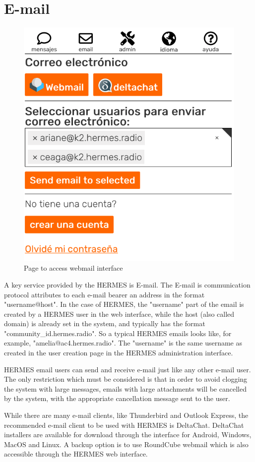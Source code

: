\documentclass[11pt,a4paper]{article}
\begin{document}
\section{E-mail}
\label{email}

\begin{figure}[H]
    \centering
    \includegraphics[width=0.5\columnwidth]{screenshots/frontend/es/email.png}
    	\caption{Page to access webmail interface}
	\vspace{-10pt}
    \label{fig:webmail2}
\end{figure}

A key service provided by the HERMES is E-mail. The E-mail is communication protocol attributes to each e-mail bearer an address in the format "username@host". In the case of HERMES, the "username" part of the email is created by a HERMES user in the web interface, while the host (also called domain) is already set in the system, and typically has the format "community\_id.hermes.radio". So a typical HERMES emails looks like, for example, "amelia@ac4.hermes.radio". The "username" is the same username as created in the user creation page in the HERMES administration interface.

HERMES email users can send and receive e-mail just like any other e-mail user. The only restriction which must be considered is that in order to avoid clogging the system with large messages, emails with large attachments will be cancelled by the system, with the appropriate cancellation message sent to the user. %

While there are many e-mail clients, like Thunderbird and Outlook Express, the recommended e-mail client to be used with HERMES is DeltaChat. DeltaChat installers are available for download through the interface for Android, Windows, MacOS and Linux. A backup option is to use RoundCube webmail which is also accessible through the HERMES web interface.
\end{document}
